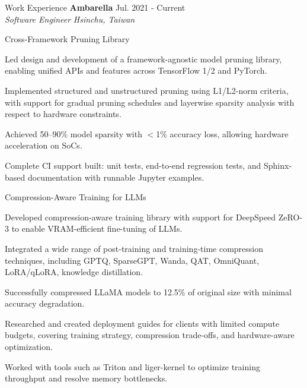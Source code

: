 \documentclass{resume} %
\begin{document}
\begin{rSection}{Work Experience}
    \textbf{Ambarella} \hfill Jul. 2021 - Current \\
    \textit{Software Engineer} \hfill \textit{Hsinchu, Taiwan} \\
    \begin{rSubsection}{Cross-Framework Pruning Library}{}{}{}
        \item Led design and development of a framework-agnostic model pruning library, enabling unified APIs and features across TensorFlow 1/2 and PyTorch.
        \item Implemented structured and unstructured pruning using L1/L2-norm criteria, with support for gradual pruning schedules and layerwise sparsity analysis with respect to hardware constraints.
        \item Achieved 50–90\% model sparsity with $<$1\% accuracy loss, allowing hardware acceleration on SoCs.
        \item Complete CI support built: unit tests, end-to-end regression tests, and Sphinx-based documentation with runnable Jupyter examples.
    \end{rSubsection}

    \begin{rSubsection}{Compression-Aware Training for LLMs}{}{}{}
        \item Developed compression-aware training library with support for DeepSpeed ZeRO-3 to enable VRAM-efficient fine-tuning of LLMs.
        \item Integrated a wide range of post-training and training-time compression techniques, including GPTQ, SparseGPT, Wanda, QAT, OmniQuant, LoRA/qLoRA, knowledge distillation.
        \item Successfully compressed LLaMA models to 12.5\% of original size with minimal accuracy degradation.
        \item Researched and created deployment guides for clients with limited compute budgets, covering training strategy, compression trade-offs, and hardware-aware optimization.
        \item Worked with tools such as Triton and liger-kernel to optimize training throughput and resolve memory bottlenecks.
    \end{rSubsection}


\end{rSection}
\end{document}
